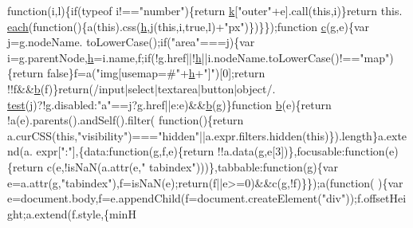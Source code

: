 \begin{DoxyCode}
{      function}(i,l)\{\textcolor{keywordflow}{if}(typeof i!==\textcolor{stringliteral}{"number"})\{\textcolor{keywordflow}{return} \hyperlink{jquery_8js_ab26645c014aa005ecedef329ecf58c99}{k}[\textcolor{stringliteral}{"outer"}+e].call(\textcolor{keyword}{this},i)\}\textcolor{keywordflow}{return} this.
      \hyperlink{jquery_8js_a871ff39db627c54c710a3e9909b8234c}{each}(\textcolor{keyword}{function}()\{a(\textcolor{keyword}{this}).css(\hyperlink{all__1a_8js_aebecdaf2444e2be39f4804412d6a3bf8}{h},j(\textcolor{keyword}{this},i,\textcolor{keyword}{true},l)+\textcolor{stringliteral}{"px"})\})\}\});\textcolor{keyword}{function} \hyperlink{jquery_8js_ad171626e81625b5e9f5cb177a3a8fb1c}{c}(g,e)\{var j=g.nodeName.
      toLowerCase();\textcolor{keywordflow}{if}(\textcolor{stringliteral}{"area"}===j)\{var i=g.parentNode,\hyperlink{all__1a_8js_aebecdaf2444e2be39f4804412d6a3bf8}{h}=i.name,f;\textcolor{keywordflow}{if}(!g.href||!\hyperlink{all__1a_8js_aebecdaf2444e2be39f4804412d6a3bf8}{h}||i.nodeName.toLowerCase()!==\textcolor{stringliteral}{"map"})\{\textcolor{keywordflow}{return} \textcolor{keyword}{
      false}\}f=a(\textcolor{stringliteral}{"img[usemap=#"}+\hyperlink{all__1a_8js_aebecdaf2444e2be39f4804412d6a3bf8}{h}+\textcolor{stringliteral}{"]"})[0];\textcolor{keywordflow}{return} !!f&&\hyperlink{jquery_8js_aa4026ad5544b958e54ce5e106fa1c805}{b}(f)\}\textcolor{keywordflow}{return}(/input|select|textarea|button|\textcolor{keywordtype}{object}/.
      \hyperlink{inv__mpu_8c_a1e8f8b1ef7fb2c429e1ce7c2f9985530}{test}(j)?!g.disabled:\textcolor{stringliteral}{"a"}==j?g.href||e:e)&&\hyperlink{jquery_8js_aa4026ad5544b958e54ce5e106fa1c805}{b}(g)\}\textcolor{keyword}{function} \hyperlink{jquery_8js_aa4026ad5544b958e54ce5e106fa1c805}{b}(e)\{\textcolor{keywordflow}{return} !a(e).parents().andSelf().filter(\textcolor{keyword}{
      function}()\{\textcolor{keywordflow}{return} a.curCSS(\textcolor{keyword}{this},\textcolor{stringliteral}{"visibility"})===\textcolor{stringliteral}{"hidden"}||a.expr.filters.hidden(\textcolor{keyword}{this})\}).length\}a.extend(a.
      expr[\textcolor{stringliteral}{":"}],\{data:function(g,f,e)\{return !!a.data(g,e[3])\},focusable:\textcolor{keyword}{function}(e)\{return c(e,!isNaN(a.attr(e,\textcolor{stringliteral}{"
      tabindex"})))\},tabbable:\textcolor{keyword}{function}(g)\{var e=a.attr(g,\textcolor{stringliteral}{"tabindex"}),f=isNaN(e);return(f||e>=0)&&c(g,!f)\}\});a(\textcolor{keyword}{function}(
      )\{var e=document.body,f=e.appendChild(f=document.createElement(\textcolor{stringliteral}{"div"}));f.offsetHeight;a.extend(f.style,\{minH

\end{DoxyCode}

